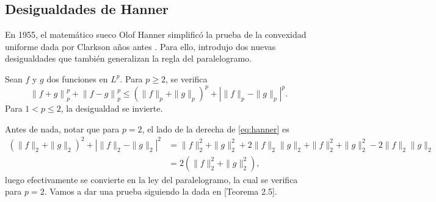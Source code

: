 \subsection{Desigualdades de Hanner}
En 1955, el matemático sueco Olof Hanner simplificó la prueba de la convexidad uniforme dada por Clarkson años antes \cite{hanner}. Para ello, introdujo dos nuevas desigualdades que también generalizan la regla del paralelogramo.

\begin{theorem}
    Sean $ f $ y $ g $ dos funciones en $L^p$. Para $ p \geq 2 $, se verifica
    \begin{equation} \label{eq:hanner}
        \left\| f+g \right\|_p^p + \left\| f-g \right\|_p^p \leq \left( \|f \|_p + \|g\|_p \right)^p + \left| \|f \|_p - \|g\|_p \right|^p.
    \end{equation}
    Para $ 1 < p \leq 2 $, la desigualdad se invierte.
\end{theorem}
Antes de nada, notar que para $ p = 2 $, el lado de la derecha de \eqref{eq:hanner} es
\begin{align}
    \left( \|f \|_2 + \|g\|_2 \right)^2 + \left| \|f \|_2 - \|g\|_2 \right|^2 &= \|f \|_2^2 + \|g\|_2^2 + 2 \|f \|_2 \|g\|_2 + \|f \|_2^2 + \|g\|_2^2 - 2 \|f \|_2 \|g\|_2 \\
    &= 2 \left(\|f \|_2^2 + \|g\|_2^2\right),
\end{align}
luego efectivamente se convierte en la ley del paralelogramo, la cual se verifica para $ p = 2 $.
Vamos a dar una prueba siguiendo la dada en \cite{lieb}[Teorema 2.5].

